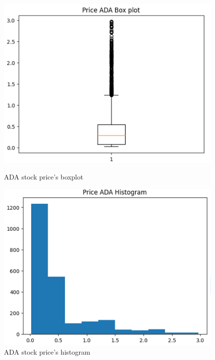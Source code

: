 \documentclass{ieeeojies}
\begin{document}
\begin{figure}[H]
    \centering
    \begin{minipage}{0.23\textwidth}
    \centering
    \includegraphics[width=1\textwidth]{bibliography/Figure/ADA_BOXPLOT.png}
    \caption{ADA stock price's boxplot}
    \label{fig:1}
    \end{minipage}
    \hfill
    \begin{minipage}{0.23\textwidth}
    \centering
    \includegraphics[width=1\textwidth]{bibliography/Figure/ADA_HISTOGRAM.png}
    \caption{ADA stock price's histogram}
    \label{fig:2}
    \end{minipage}
\end{figure}
\end{document}
